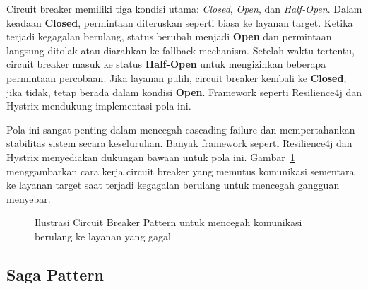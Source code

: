 Circuit breaker memiliki tiga kondisi utama: \textit{Closed}, \textit{Open}, dan \textit{Half-Open}. Dalam keadaan \textbf{Closed}, permintaan diteruskan seperti biasa ke layanan target. Ketika terjadi kegagalan berulang, status berubah menjadi \textbf{Open} dan permintaan langsung ditolak atau diarahkan ke fallback mechanism. Setelah waktu tertentu, circuit breaker masuk ke status \textbf{Half-Open} untuk mengizinkan beberapa permintaan percobaan. Jika layanan pulih, circuit breaker kembali ke \textbf{Closed}; jika tidak, tetap berada dalam kondisi \textbf{Open}. Framework seperti Resilience4j dan Hystrix mendukung implementasi pola ini.


Pola ini sangat penting dalam mencegah cascading failure dan mempertahankan stabilitas sistem secara keseluruhan. Banyak framework seperti Resilience4j dan Hystrix menyediakan dukungan bawaan untuk pola ini. Gambar~\ref{fig:circuit-breaker-pattern} menggambarkan cara kerja circuit breaker yang memutus komunikasi sementara ke layanan target saat terjadi kegagalan berulang untuk mencegah gangguan menyebar.

\begin{figure}[h]
	\centering
	\caption{Ilustrasi Circuit Breaker Pattern untuk mencegah komunikasi berulang ke layanan yang gagal}
	\vspace{0.5em}
	\label{fig:circuit-breaker-pattern}
\end{figure}

\subsection{Saga Pattern}

